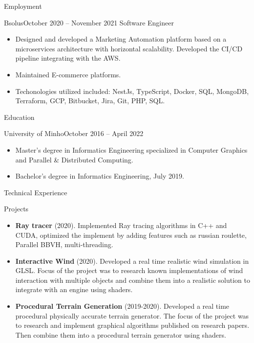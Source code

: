 \documentclass[]{mcdowellcv}
\begin{document}
	\makeheader

	\begin{cvsection}{Employment}
		\begin{cvsubsection}{Bsolus}{}{October 2020 -- November 2021}
			Software Engineer
			\begin{itemize}
                \item Designed and developed a Marketing Automation platform based on a microservices architecture with horizontal scalability. Developed the CI/CD pipeline integrating with the AWS.
                \item Maintained E-commerce platforms.
                \item Techonologies utilized included: NestJs, TypeScript, Docker, SQL, MongoDB, Terraform, GCP, Bitbucket, Jira, Git, PHP, SQL.
			\end{itemize}
		\end{cvsubsection}
	\end{cvsection}

	\begin{cvsection}{Education}
		\begin{cvsubsection}{University of Minho}{}{October 2016 -- April 2022}
			\begin{itemize}
                \item Master’s degree in Informatics Engineering specialized in Computer Graphics and Parallel \& Distributed Computing.
                \item Bachelor's degree in Informatics Engineering, July 2019.
			\end{itemize}
		\end{cvsubsection}
	\end{cvsection}

	\begin{cvsection}{Technical Experience}
		\begin{cvsubsection}{Projects}{}{}
			\begin{itemize}
				\item \textbf{Ray tracer} (2020). Implemented Ray tracing algorithms in C++ and CUDA, optimized the implement by adding features such as russian roulette, Parallel BBVH, multi-threading.
				\item \textbf{Interactive Wind} (2020). Developed a real time realistic wind simulation in GLSL. Focus of the project was to research known implementations of wind interaction with multiple objects and combine them into a realistic solution to integrate with an engine using shaders.
				\item \textbf{Procedural Terrain Generation} (2019-2020). Developed a real time procedural physically accurate terrain generator. The focus of the project was to research and implement graphical algorithms published on research papers. Then combine them into a procedural terrain generator using shaders.
			\end{itemize}
		\end{cvsubsection}
	\end{cvsection}
\end{document}
